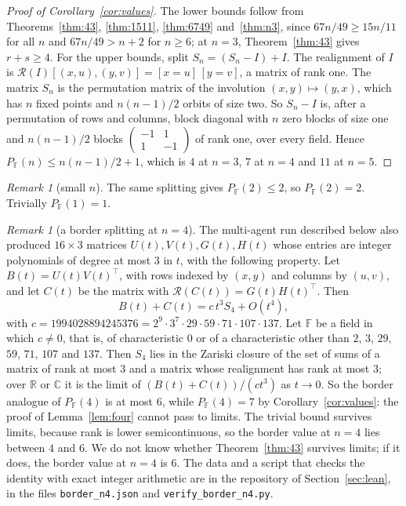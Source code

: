 \documentclass[11pt]{amsart}
\theoremstyle{remark}
\newtheorem{remark}[theorem]{Remark}
\newcommand{\F}{\mathbb{F}}
\newcommand{\R}{\mathcal{R}}
\begin{document}
\begin{proof}[Proof of Corollary~\ref{cor:values}]
The lower bounds follow from Theorems~\ref{thm:43}, \ref{thm:1511}, \ref{thm:6749} and~\ref{thm:n3}, since
$67n/49\ge15n/11$ for all $n$ and $67n/49>n+2$ for $n\ge6$; at $n=3$, Theorem~\ref{thm:43} gives
$r+s\ge4$. For the upper bounds, split $S_n=(S_n-I)+I$. The realignment of $I$ is
$\R(I)[(x,u),(y,v)]=[x=u]\,[y=v]$, a matrix of rank one. The matrix $S_n$ is the permutation matrix of the
involution $(x,y)\mapsto(y,x)$, which has $n$ fixed points and $n(n-1)/2$ orbits of size two. So $S_n-I$ is,
after a permutation of rows and columns, block diagonal with $n$ zero blocks of size one and $n(n-1)/2$ blocks
$\left(\begin{smallmatrix}-1&1\\1&-1\end{smallmatrix}\right)$ of rank one, over every field. Hence
$P_\F(n)\le n(n-1)/2+1$, which is $4$ at $n=3$, $7$ at $n=4$ and $11$ at $n=5$.
\end{proof}

\begin{remark}[small $n$]
The same splitting gives $P_\F(2)\le2$, so $P_\F(2)=2$. Trivially $P_\F(1)=1$.
\end{remark}

\begin{remark}[a border splitting at $n=4$]\label{rem:border}
The multi-agent run described below also produced $16\times3$ matrices $U(t),V(t),G(t),H(t)$ whose entries
are integer polynomials of degree at most $3$ in $t$, with the following property. Let $B(t)=U(t)V(t)^{\top}$,
with rows indexed by $(x,y)$ and columns by $(u,v)$, and let $C(t)$ be the matrix with
$\R(C(t))=G(t)H(t)^{\top}$. Then
\[
  B(t)+C(t)=c\,t^3S_4+O(t^4),
\]
with $c=1994028894245376=2^9\cdot3^7\cdot29\cdot59\cdot71\cdot107\cdot137$.
Let $\F$ be a field in which $c\ne0$, that is, of characteristic $0$ or of a characteristic other than $2$, $3$, $29$, $59$, $71$, $107$
and $137$. Then $S_4$ lies in the Zariski closure of the set of sums of a matrix of rank at
most $3$ and a matrix whose realignment has rank at most $3$; over $\mathbb R$ or $\mathbb C$ it is the limit
of $(B(t)+C(t))/(ct^3)$ as $t\to0$. So the border analogue of $P_\F(4)$ is at most $6$, while
$P_\F(4)=7$ by Corollary~\ref{cor:values}: the proof of Lemma~\ref{lem:four} cannot pass to limits. The
trivial bound survives limits, because rank is lower semicontinuous, so the border value at $n=4$ lies
between $4$ and $6$. We do not know whether Theorem~\ref{thm:43} survives limits; if it does, the border
value at $n=4$ is $6$. The data and a script that checks the identity with exact integer arithmetic are in
the repository of Section~\ref{sec:lean}, in the files \texttt{border\_n4.json} and
\texttt{verify\_border\_n4.py}.
\end{remark}
\end{document}

